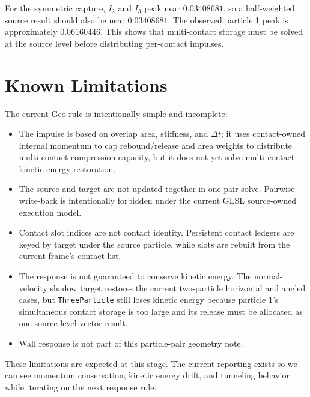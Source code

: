 For the symmetric capture, \(I_2\) and \(I_3\) peak near \(0.03408681\), so a
half-weighted source result should also be near \(0.03408681\).  The observed
particle 1 peak is approximately \(0.06160446\).  This shows that
multi-contact storage must be solved at the source level before distributing
per-contact impulses.

\section{Known Limitations}
\label{sec:known-limitations}

The current Geo rule is intentionally simple and incomplete:

\begin{itemize}[leftmargin=*]
    \item The impulse is based on overlap area, stiffness, and $\Delta t$; it
    uses contact-owned internal momentum to cap rebound/release and area
    weights to distribute multi-contact compression capacity, but it does not
    yet solve multi-contact kinetic-energy restoration.
    \item The source and target are not updated together in one pair solve.
    Pairwise write-back is intentionally forbidden under the current GLSL
    source-owned execution model.
    \item Contact slot indices are not contact identity.  Persistent contact
    ledgers are keyed by target under the source particle, while slots are
    rebuilt from the current frame's contact list.
    \item The response is not guaranteed to conserve kinetic energy.
    The normal-velocity shadow target restores the current two-particle
    horizontal and angled cases, but \texttt{ThreeParticle} still loses kinetic
    energy because particle 1's simultaneous contact storage is too large and
    its release must be allocated as one source-level vector result.
    \item Wall response is not part of this particle-pair geometry note.
\end{itemize}

These limitations are expected at this stage.  The current reporting exists so
we can see momentum conservation, kinetic energy drift, and tunneling behavior
while iterating on the next response rule.
